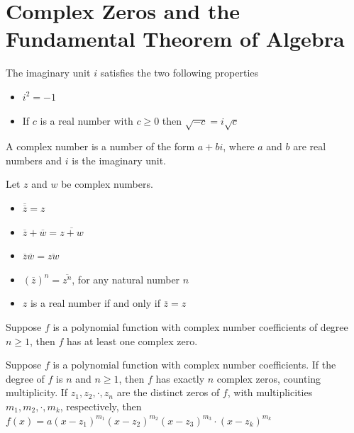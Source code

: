 \section{Complex Zeros and the Fundamental Theorem of Algebra}

\begin{definition}
    The imaginary unit $i$ satisfies the two following properties
    \begin{itemize}
        \item $i^2 = -1$
        \item If $c$ is a real number with $c \geq 0$ then $\sqrt{-c} = i \sqrt{c}$
    \end{itemize}
\end{definition}

\begin{definition}
    A complex number is a number of the form $a+bi$, where $a$ and $b$ are real numbers and $i$ is the imaginary unit.
\end{definition}

\begin{theorem}
    Let $z$ and $w$ be complex numbers.
    \begin{itemize}
        \item $\overline{\overline{z}} = z$
        \item $\overline{z} + \overline{w} = \overline{z + w}$
        \item $\overline{z}\overline{w} = \overline{zw}$
        \item $(\overline{z})^n = \overline{z^n}$, for any natural number $n$
        \item $z$ is a real number if and only if $\overline{z} = z$
    \end{itemize}
\end{theorem}

\begin{theorem}
    Suppose $f$ is a polynomial function with complex number coefficients of degree $n \geq 1$, then $f$ has at least one complex zero.
\end{theorem}

\begin{theorem}
    Suppose $f$ is a polynomial function with complex number coefficients. If the degree of $f$ is $n$ and $n \geq 1$, then $f$ has exactly $n$ complex zeros, counting multiplicity. If $z_1, z_2, \cdot, z_n$ are the distinct zeros of $f$, with multiplicities $m_1, m_2, \cdot, m_k$, respectively, then $f(x) = a(x-z_1)^{m_1}(x-z_2)^{m_2}(x-z_3)^{m_3}\cdot (x - z_k)^{m_k}$
\end{theorem}

